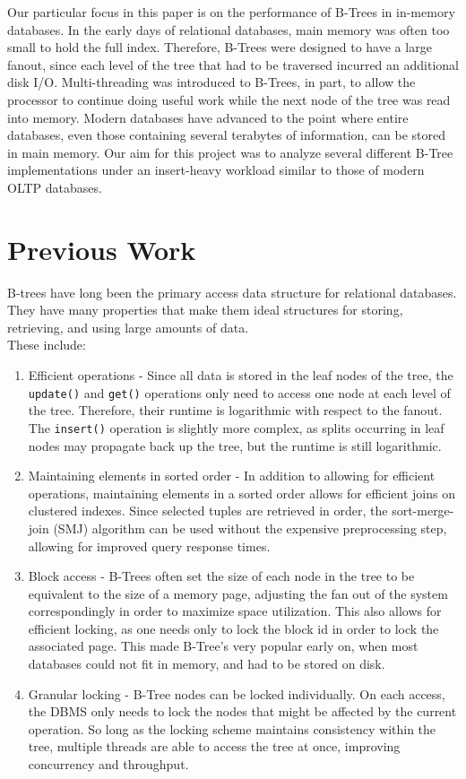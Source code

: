 \documentclass{sig-alternate}
\begin{document}
Our particular focus in this paper is on the performance of B-Trees in in-memory databases. In the early days of relational databases, main memory was often too small to hold the full index. Therefore, B-Trees were designed to have a large fanout, since each level of the tree that had to be traversed incurred an additional disk I/O. Multi-threading was introduced to B-Trees, in part, to allow the processor to continue doing useful work while the next node of the tree was read into memory. Modern databases have advanced to the point where entire databases, even those containing several terabytes of information, can be stored in main memory. Our aim for this project was to analyze several different B-Tree implementations under an insert-heavy workload similar to those of modern OLTP databases.

\section{Previous Work}
B-trees have long been the primary access data structure for  relational databases. They have many properties that make them ideal structures for storing, retrieving, and using large amounts of data.\\
These include:
\begin{enumerate}
\item Efficient operations - Since all data is stored in the leaf nodes of the tree, the \texttt{update()} and \texttt{get()} operations only need to access one node at each level of the tree. Therefore, their runtime is logarithmic with respect to the fanout. The \texttt{insert()} operation is slightly more complex, as splits occurring in leaf nodes may propagate back up the tree, but the runtime is still logarithmic.
\item Maintaining elements in sorted order - In addition to allowing for efficient operations, maintaining elements in a sorted order allows for efficient joins on clustered indexes. Since selected tuples are retrieved in order, the sort-merge-join (SMJ) algorithm can be used without the expensive preprocessing step, allowing for improved query response times.
\item Block access - B-Trees often set the size of each node in the tree to be equivalent to the size of a memory page, adjusting the fan out of the system correspondingly in order to maximize space utilization. This also allows for efficient locking, as one needs only to lock the block id in order to lock the associated page. This made B-Tree's very popular early on, when most databases could not fit in memory, and had to be stored on disk.
\item Granular locking - B-Tree nodes can be locked individually. On each access, the DBMS only needs to lock the nodes that might be affected by the current operation. So long as the locking scheme maintains consistency within the tree, multiple threads are able to access the tree at once, improving concurrency and throughput.
\end{enumerate}
\end{document}
